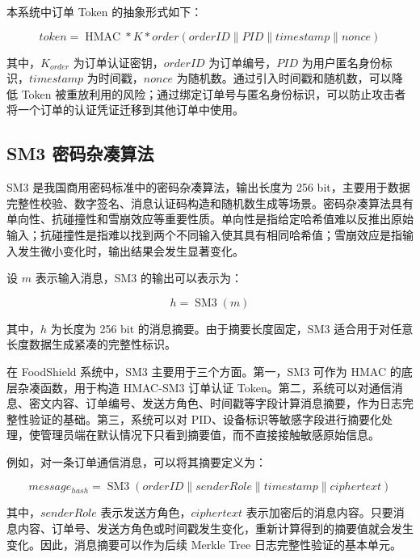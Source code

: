 \documentclass[UTF8,a4paper,zihao=-4,fontset=fandol]{ctexart}
\begin{document}
本系统中订单 Token 的抽象形式如下：

\begin{equation}
token=\operatorname{HMAC}*{K*{order}}(orderID \parallel PID \parallel timestamp \parallel nonce)
\end{equation}

其中，$K_{order}$ 为订单认证密钥，$orderID$ 为订单编号，$PID$ 为用户匿名身份标识，$timestamp$ 为时间戳，$nonce$ 为随机数。通过引入时间戳和随机数，可以降低 Token 被重放利用的风险；通过绑定订单号与匿名身份标识，可以防止攻击者将一个订单的认证凭证迁移到其他订单中使用。

\subsection{SM3 密码杂凑算法}

SM3 是我国商用密码标准中的密码杂凑算法，输出长度为 256 bit，主要用于数据完整性校验、数字签名、消息认证码构造和随机数生成等场景。密码杂凑算法具有单向性、抗碰撞性和雪崩效应等重要性质。单向性是指给定哈希值难以反推出原始输入；抗碰撞性是指难以找到两个不同输入使其具有相同哈希值；雪崩效应是指输入发生微小变化时，输出结果会发生显著变化。

设 $m$ 表示输入消息，SM3 的输出可以表示为：

\begin{equation}
h = \operatorname{SM3}(m)
\end{equation}

其中，$h$ 为长度为 256 bit 的消息摘要。由于摘要长度固定，SM3 适合用于对任意长度数据生成紧凑的完整性标识。

在 FoodShield 系统中，SM3 主要用于三个方面。第一，SM3 可作为 HMAC 的底层杂凑函数，用于构造 HMAC-SM3 订单认证 Token。第二，系统可以对通信消息、密文内容、订单编号、发送方角色、时间戳等字段计算消息摘要，作为日志完整性验证的基础。第三，系统可以对 PID、设备标识等敏感字段进行摘要化处理，使管理员端在默认情况下只看到摘要值，而不直接接触敏感原始信息。

例如，对一条订单通信消息，可以将其摘要定义为：

\begin{equation}
message_{hash}= \operatorname{SM3}(orderID \parallel senderRole \parallel timestamp \parallel ciphertext)
\end{equation}

其中，$senderRole$ 表示发送方角色，$ciphertext$ 表示加密后的消息内容。只要消息内容、订单号、发送方角色或时间戳发生变化，重新计算得到的摘要值就会发生变化。因此，消息摘要可以作为后续 Merkle Tree 日志完整性验证的基本单元。
\end{document}
